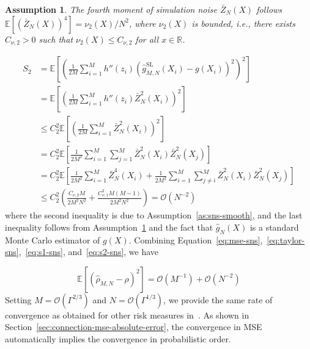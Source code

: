 \documentclass{article}
\newtheorem{assumption}{Assumption}
\begin{document}
\begin{assumption} \label{as:sns-noise-var}
    The fourth moment of simulation noise $\bar{Z}_N(X)$ follows $\mathbb{E} \left[ \left( \bar{Z}_N(X) \right)^4 \right] = \nu_2(X) / N^2$, where $\nu_2(X)$ is bounded, i.e., there exists $C_{\nu,2} > 0$ such that $\nu_2(X) \leq C_{\nu,2}$ for all $x \in \mathbb{R}$.
\end{assumption}

\begin{align} \label{eq:s2-sns}
    S_2 & = \mathbb{E} \left[ \left( \frac{1}{2M} \sum_{i=1}^M h''\left( z_i \right) \left( \hat{g}^{\text{SL}}_{M, N}(X_i) - g(X_i) \right)^2 \right)^2\right] \nonumber \\
    & = \mathbb{E} \left[ \left(\frac{1}{2M} \sum_{i=1}^M h''\left( z_i \right) \bar{Z}^2_N(X_i) \right)^2 \right] \nonumber \\
    & \leq C_2^2 \mathbb{E} \left[ \left(\frac{1}{2M} \sum_{i=1}^M \bar{Z}^2_N(X_i) \right)^2 \right] \nonumber \\
    & = C_2^2 \mathbb{E} \left[ \frac{1}{2M^2} \sum_{i=1}^M \sum_{j=1}^M \bar{Z}^2_N(X_i) \bar{Z}^2_N(X_j) \right] \nonumber \\
    & = C_2^2 \mathbb{E} \left[ \frac{1}{2M^2} \sum_{i=1}^M \bar{Z}_N^4(X_i) + \frac{1}{2M^2} \sum_{i=1}^M \sum_{j \neq i}^M \bar{Z}_N^2(X_i) \bar{Z}_N^2(X_j) \right] \nonumber \\
    & \leq  C_2^2 \left(\frac{ C_{\nu, 2} M}{2M^2N^2} + \frac{C_{\nu,1}^2M(M-1)}{2M^2N^2}\right) = \mathcal{O}(N^{-2})
\end{align}
where the second inequality is due to Assumption~\ref{as:sns-smooth}, and the last inequality follows from Assumption~\ref{as:sns-noise-var} and the fact that $\hat{g}_{N}(X)$ is a standard Monte Carlo estimator of $g(X)$.
Combining Equation~\ref{eq:mse-sns},~\ref{eq:taylor-sns},~\ref{eq:s1-sns}, and~\ref{eq:s2-sns}, we have

\begin{equation} \label{eq:mse-sns-smooth}
    \mathbb{E} \left[ \left( \hat{\rho}_{M, N} - \rho \right)^2 \right] = \mathcal{O}(M^{-1}) + \mathcal{O}(N^{-2})
\end{equation}
Setting $M = \mathcal{O}(\Gamma^{2/3})$ and $N = \mathcal{O}(\Gamma^{1/3})$, we provide the same rate of convergence as obtained for other risk measures in~\cite{gordy2010nested}.
As shown in Section~\ref{sec:connection-mse-absolute-error}, the convergence in MSE automatically implies the convergence in probabilistic order.
\end{document}
